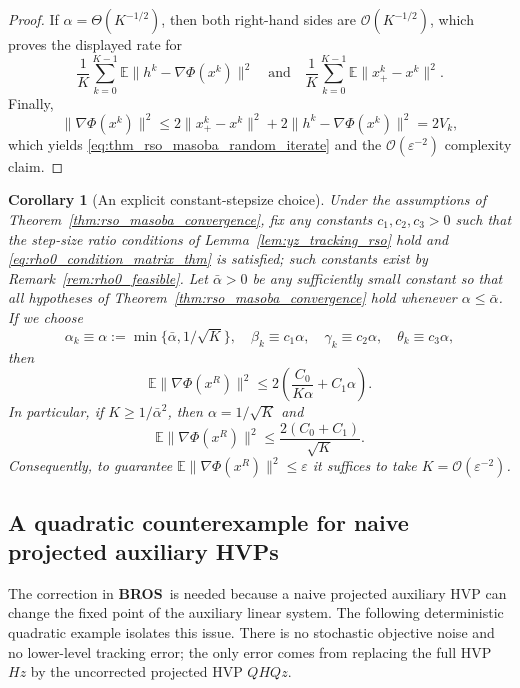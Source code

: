 \documentclass{pkumelon}
\theoremstyle{plain}
\newtheorem{corollary}{Corollary}
\newcommand{\E}{\mathbb{E}}
\newcommand{\Phiobj}{\Phi}
\newcommand{\oursname}{\textnormal{\textbf{BROS}}}
\newcommand{\ours}{\oursname\ }
\begin{document}
\begin{proof}
If $\alpha=\Theta(K^{-1/2})$, then both right-hand sides are $\mathcal O(K^{-1/2})$, which proves the displayed rate for
\begin{equation*}
\frac{1}{K}\sum_{k=0}^{K-1}\E\|h^k-\nabla\Phiobj(x^k)\|^2 \quad\text{and}\quad \frac{1}{K}\sum_{k=0}^{K-1}\E\|x_+^k-x^k\|^2.
\end{equation*}
Finally,
\begin{equation*}
\|\nabla\Phiobj(x^k)\|^2 \le 2\|x_+^k-x^k\|^2+2\|h^k-\nabla\Phiobj(x^k)\|^2 = 2V_k,
\end{equation*}
which yields \eqref{eq:thm_rso_masoba_random_iterate} and the $\mathcal O(\varepsilon^{-2})$ complexity claim.
\end{proof}

\begin{corollary}[An explicit constant-stepsize choice]\label{cor:rso_masoba_rate}
Under the assumptions of Theorem~\ref{thm:rso_masoba_convergence}, fix any constants $c_1,c_2,c_3>0$ such that the step-size ratio conditions of Lemma~\ref{lem:yz_tracking_rso} hold and \eqref{eq:rho0_condition_matrix_thm} is satisfied; such constants exist by Remark~\ref{rem:rho0_feasible}. Let $\bar\alpha>0$ be any sufficiently small constant so that all hypotheses of Theorem~\ref{thm:rso_masoba_convergence} hold whenever $\alpha\le \bar\alpha$. If we choose
\begin{equation*}
\alpha_k\equiv\alpha:=\min\{\bar\alpha,1/\sqrt K\}, \quad \beta_k\equiv c_1\alpha,\quad \gamma_k\equiv c_2\alpha,\quad \theta_k\equiv c_3\alpha,
\end{equation*}
then
\begin{equation*}
\E\|\nabla\Phiobj(x^R)\|^2\le 2\left(\frac{C_0}{K\alpha}+C_1\alpha\right).
\end{equation*}
In particular, if $K\ge 1/\bar\alpha^2$, then $\alpha=1/\sqrt K$ and
\begin{equation*}
\E\|\nabla\Phiobj(x^R)\|^2\le \frac{2(C_0+C_1)}{\sqrt K}.
\end{equation*}
Consequently, to guarantee $\E\|\nabla\Phiobj(x^R)\|^2\le \varepsilon$ it suffices to take $K=\mathcal O(\varepsilon^{-2})$.
\end{corollary}

\subsection{A quadratic counterexample for naive projected auxiliary HVPs}
\label{app:counterexample}

The correction in \ours is needed because a naive projected auxiliary HVP can change the fixed point of the auxiliary linear system. The following deterministic quadratic example isolates this issue. There is no stochastic objective noise and no lower-level tracking error; the only error comes from replacing the full HVP $Hz$ by the uncorrected projected HVP $QHQz$.
\end{document}
